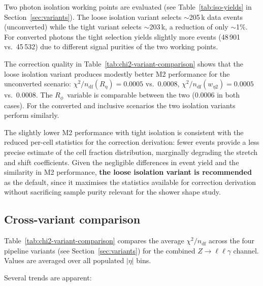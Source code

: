 \documentclass[11pt,a4paper]{article}
\newcommand{\Reta}{\ensuremath{R_{\eta}}}
\newcommand{\Rphi}{\ensuremath{R_{\phi}}}
\newcommand{\weta}{\ensuremath{w_{\eta 2}}}
\newcommand{\abseta}{\ensuremath{|\eta|}}
\newcommand{\chisq}{\ensuremath{\chi^2 / n_{\mathrm{df}}}}
\begin{document}
Two photon isolation working points are evaluated (see
Table~\ref{tab:iso-yields} in Section~\ref{sec:variants}).  The loose
isolation variant selects $\sim$205\,k data events (unconverted) while
the tight variant selects $\sim$203\,k, a reduction of only $\sim$1\%.
For converted photons the tight selection yields slightly more events
(48\,901 vs.\ 45\,532) due to different signal purities of the two
working points.

The correction quality in Table~\ref{tab:chi2-variant-comparison} shows
that the loose isolation variant produces modestly better M2 performance
for the unconverted scenario: $\chisq(\Reta) = 0.0005$ vs.\ $0.0008$,
$\chisq(\weta) = 0.0005$ vs.\ $0.0008$.  The \Rphi\ variable is
comparable between the two (0.0006 in both cases).  For the converted
and inclusive scenarios the two isolation variants perform similarly.

The slightly lower M2 performance with tight isolation is consistent
with the reduced per-cell statistics for the correction derivation:
fewer events provide a less precise estimate of the cell fraction
distribution, marginally degrading the stretch and shift coefficients.
Given the negligible differences in event yield and the similarity in
M2 performance, \textbf{the loose isolation variant is recommended} as
the default, since it maximises the statistics available for correction
derivation without sacrificing sample purity relevant for the shower
shape study.


\subsection{Cross-variant comparison}
\label{sec:disc-variants}

Table~\ref{tab:chi2-variant-comparison} compares the average
$\chisq$ across the four pipeline variants (see
Section~\ref{sec:variants}) for the combined $Z \to \ell\ell\gamma$
channel.  Values are averaged over all populated $\abseta$ bins.



Several trends are apparent:
\end{document}
